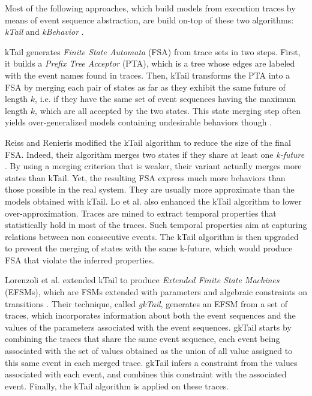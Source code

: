 Most of the following approaches, which build models from
execution traces by means of event sequence abstraction, are
build on-top of these two algorithms: \textit{kTail}
\cite{5009015} and \textit{kBehavior} \cite{mariani2007dynamic}.

kTail generates \textit{Finite State Automata} (FSA) from trace
sets in two steps. First, it builds a \textit{Prefix Tree
Acceptor} (PTA), which is a tree whose edges are labeled with
the event names found in traces. Then, kTail transforms the PTA
into a FSA by merging each pair of states as far as they exhibit
the same future of length $k$, i.e. if they have the same set of
event sequences having the maximum length $k$, which are all
accepted by the two states. This state merging step often yields
over-generalized models containing undesirable behaviors though
\cite{4023976}.

Reiss and Renieris modified the kTail algorithm to reduce the
size of the final FSA.  Indeed, their algorithm merges two states
if they share at least one \textit{k-future} \cite{919096}. By
using a merging criterion that is weaker, their variant actually
merges more states than kTail. Yet, the resulting FSA
express much more behaviors than those possible in the real
system. They are usually more approximate than the models
obtained with kTail. Lo et al. \cite{Lo:2009:ASB:1595696.1595761}
also enhanced the kTail algorithm to lower over-approximation.
Traces are mined to extract temporal properties that
statistically hold in most of the traces. Such temporal
properties aim at capturing relations between non consecutive
events. The kTail algorithm is then upgraded to prevent the
merging of states with the same k-future, which would produce FSA
that violate the inferred properties.

Lorenzoli et al. extended kTail to produce \textit{Extended
Finite State Machines} (EFSMs), which are FSMs extended with
parameters and algebraic constraints on transitions
\cite{Lorenzoli2008}. Their technique, called \textit{gkTail},
generates an EFSM from a set of traces, which incorporates
information about both the event sequences and the values of the
parameters associated with the event sequences. gkTail starts by
combining the traces that share the same event sequence, each
event being associated with the set of values obtained as the
union of all value assigned to this same event in each merged
trace. gkTail infers a constraint from the values associated with
each event, and combines this constraint with the associated
event. Finally, the kTail algorithm is applied on these traces.

